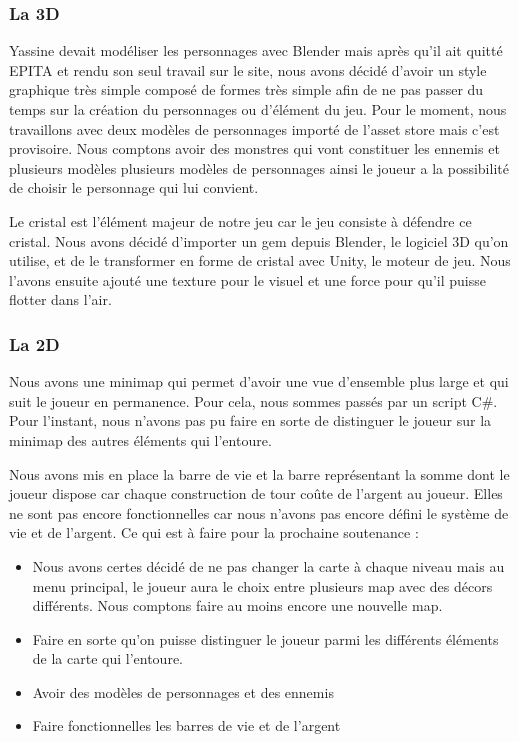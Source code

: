 \documentclass[a4paper, 12pt]{article}
\begin{document}
		\subsubsection{La 3D}
		Yassine devait modéliser les personnages avec Blender mais après qu’il ait quitté EPITA et rendu son seul travail sur le site, nous avons décidé d’avoir un style graphique très simple composé de formes très simple afin de ne pas passer du temps sur la création du personnages ou d’élément du jeu.  Pour le moment, nous travaillons avec deux modèles de personnages importé de l’asset store mais c’est provisoire. Nous comptons avoir des monstres qui vont constituer les ennemis et plusieurs modèles plusieurs modèles de personnages ainsi le joueur a la possibilité de choisir le personnage qui lui convient.  
\par Le cristal est l’élément majeur de notre jeu car le jeu consiste à défendre ce cristal. Nous avons décidé d’importer un gem depuis Blender, le logiciel 3D qu’on utilise, et de le transformer en forme de cristal avec Unity, le moteur de jeu. Nous l’avons ensuite ajouté une texture pour le visuel et une force pour qu’il puisse flotter dans l’air.

		\subsubsection{La 2D}
Nous avons une minimap qui permet d’avoir une vue d’ensemble plus large et qui suit le joueur en permanence. Pour cela, nous sommes passés par un script C\#.  Pour l’instant, nous n’avons pas pu faire en sorte de distinguer le joueur sur la minimap des autres éléments qui l’entoure.
\par Nous avons mis en place la barre de vie et la barre représentant la somme dont le joueur dispose car chaque construction de tour coûte de l’argent au joueur. Elles ne sont pas encore fonctionnelles car nous n’avons pas encore défini le système de vie et de l’argent.
Ce qui est à faire pour la prochaine soutenance :
\begin{itemize}
\item Nous avons certes décidé de ne pas changer la carte à chaque niveau mais au menu principal, le joueur aura le choix entre plusieurs map avec des décors différents. Nous comptons faire au moins encore une nouvelle map.
\item Faire en sorte qu’on puisse distinguer le joueur parmi les différents éléments de la carte qui l’entoure.
\item Avoir des modèles de personnages et des ennemis
\item Faire fonctionnelles les barres de vie et de l’argent

\end{itemize}
\end{document}
